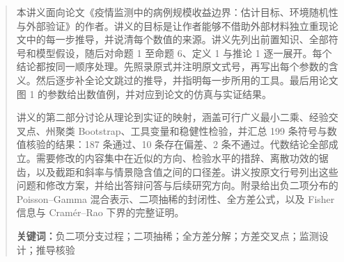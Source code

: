 \begin{abstract}
本讲义面向论文《疫情监测中的病例规模收益边界：估计目标、环境随机性与外部验证》的作者。讲义的目标是让作者能够不借助外部材料独立重现论文中的每一步推导，并说清每个数值的来源。讲义先列出前置知识、全部符号和模型假设，随后对命题 1 至命题 6、定义 1 与推论 1 逐一展开。每个结论都按同一顺序处理。先照录原式并注明原文式号，再写出每个参数的含义。然后逐步补全论文跳过的推导，并指明每一步所用的工具。最后用论文图 1 的参数给出数值例，并对应到论文的仿真与实证结果。

讲义的第二部分讨论从理论到实证的映射，涵盖可行广义最小二乘、经验交叉点、州聚类 Bootstrap、工具变量和稳健性检验，并汇总 199 条符号与数值核验的结果：187 条通过、10 条存在偏差、2 条不通过。代数结论全部成立。需要修改的内容集中在近似的方向、检验水平的措辞、离散功效的锯齿，以及截距和斜率与情景隐含值之间的口径差。讲义按原文行号列出这些问题和修改方案，并给出答辩问答与后续研究方向。附录给出负二项分布的 Poisson--Gamma 混合表示、二项抽稀的封闭性、全方差公式，以及 Fisher 信息与 Cram\'er--Rao 下界的完整证明。

\vspace{0.8em}
\noindent\textbf{关键词：}负二项分支过程；二项抽稀；全方差分解；方差交叉点；监测设计；推导核验
\end{abstract}
